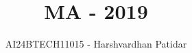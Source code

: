 \documentclass[journal]{IEEEtran}
\begin{document}

\vspace{3cm}

\title{MA - 2019}
\author{AI24BTECH11015 - Harshvardhan Patidar}
 \maketitle
{\let\newpage\relax\maketitle}

\renewcommand{\thefigure}{\theenumi}
\renewcommand{\thetable}{\theenumi}
\setlength{\intextsep}{10pt} %


\renewcommand{\thetable}{\theenumi}
\end{document}
